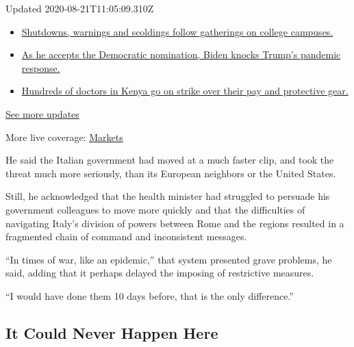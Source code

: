 Updated 2020-08-21T11:05:09.310Z

\begin{itemize}
\tightlist
\item
  \href{https://www.nytimes3xbfgragh.onion/2020/08/21/world/covid-19-coronavirus.html?action=click\&pgtype=Article\&state=default\&region=MAIN_CONTENT_1\&context=storylines_live_updates\#link-4690b6aa}{Shutdowns,
  warnings and scoldings follow gatherings on college campuses.}
\item
  \href{https://www.nytimes3xbfgragh.onion/2020/08/21/world/covid-19-coronavirus.html?action=click\&pgtype=Article\&state=default\&region=MAIN_CONTENT_1\&context=storylines_live_updates\#link-324af071}{As
  he accepts the Democratic nomination, Biden knocks Trump's pandemic
  response.}
\item
  \href{https://www.nytimes3xbfgragh.onion/2020/08/21/world/covid-19-coronavirus.html?action=click\&pgtype=Article\&state=default\&region=MAIN_CONTENT_1\&context=storylines_live_updates\#link-35890b73}{Hundreds
  of doctors in Kenya go on strike over their pay and protective gear.}
\end{itemize}

\href{https://www.nytimes3xbfgragh.onion/2020/08/21/world/covid-19-coronavirus.html?action=click\&pgtype=Article\&state=default\&region=MAIN_CONTENT_1\&context=storylines_live_updates}{See
more updates}

More live coverage:
\href{https://www.nytimes3xbfgragh.onion/live/2020/08/20/business/stock-market-today-coronavirus?action=click\&pgtype=Article\&state=default\&region=MAIN_CONTENT_1\&context=storylines_live_updates}{Markets}

He said the Italian government had moved at a much faster clip, and took
the threat much more seriously, than its European neighbors or the
United States.

Still, he acknowledged that the health minister had struggled to
persuade his government colleagues to move more quickly and that the
difficulties of navigating Italy's division of powers between Rome and
the regions resulted in a fragmented chain of command and inconsistent
messages.

``In times of war, like an epidemic,'' that system presented grave
problems, he said, adding that it perhaps delayed the imposing of
restrictive measures.

``I would have done them 10 days before, that is the only difference.''

\hypertarget{it-could-never-happen-here}{%
\subsection{It Could Never Happen
Here}\label{it-could-never-happen-here}}

